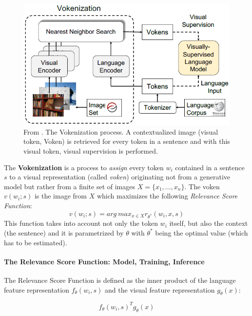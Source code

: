 \documentclass[
]{krantz}
\begin{document}
\begin{figure}

{\centering \includegraphics[width=0.8\linewidth]{figures/02-03-img-support-text/img-tan2020-05} 

}

\caption{From \citet{tan2020vokenization}. The Vokenization process. A contextualized image (visual token, Voken) is retrieved for every token in a sentence and with this visual token, visual supervision is performed.}\label{fig:img-tan2020-05}
\end{figure}



The \textbf{Vokenization} is a process to \emph{assign} every token \(w_i\) contained in a sentence \(s\) to a visual representation (called \emph{voken}) originating not from a generative model but rather from a finite set of images \(X=\{x_1,...,x_n\}\). The voken \(v(w_i;s)\) is the image from \(X\) which maximizes the following \emph{Relevance Score Function}:
\[v(w_i;s)=arg\ max_{x\in X}r_{\theta^{*}}(w_i,x,s)\]
This function takes into account not only the token \(w_i\) itself, but also the context (the sentence) and it is parametrized by \(\theta\) with \(\theta^{*}\) being the optimal value (which has to be estimated).

\hypertarget{the-relevance-score-function-model-training-inference}{%
\paragraph{The Relevance Score Function: Model, Training, Inference}\label{the-relevance-score-function-model-training-inference}}

The Relevance Score Function is defined as the inner product of the language feature representation \(f_{\theta}(w_i,s)\) and the visual feature representation \(g_{\theta}(x)\):

\[f_{\theta}(w_i,s)^Tg_{\theta}(x)\]
\end{document}

